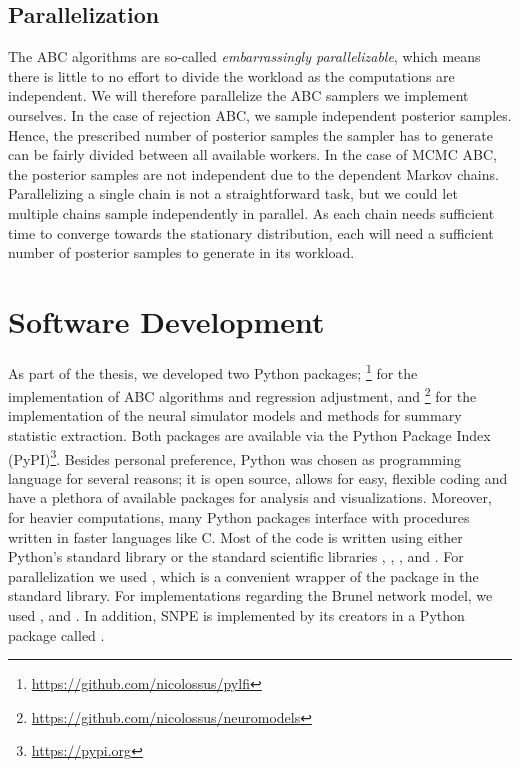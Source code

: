\subsection{Parallelization}

The ABC algorithms are so-called \textit{embarrassingly parallelizable}, which means there is little to no effort to divide the workload as the computations are independent. We will therefore parallelize the ABC samplers we implement ourselves. In the case of rejection ABC, we sample independent posterior samples. Hence, the prescribed number of posterior samples the sampler has to generate can be fairly divided between all available workers. In the case of MCMC ABC, the posterior samples are not independent due to the dependent Markov chains. Parallelizing a single chain is not a straightforward task, but we could let multiple chains sample independently in parallel. As each chain needs sufficient time to converge towards the stationary distribution, each will need a sufficient number of posterior samples to generate in its workload.

\section{Software Development}\label{sec:software}

As part of the thesis, we developed two Python packages; \footnote{\url{https://github.com/nicolossus/pylfi}} for the implementation of ABC algorithms and regression adjustment, and \footnote{\url{https://github.com/nicolossus/neuromodels}} for the implementation of the neural simulator models and methods for summary statistic extraction. Both packages are available via the Python Package Index (PyPI)\footnote{\url{https://pypi.org}}. Besides personal preference, Python was chosen as programming language for several reasons; it is open source, allows for easy, flexible coding and have a plethora of available packages for analysis and visualizations. Moreover, for heavier computations, many Python packages interface with procedures written in faster languages like C. Most of the code is written using either Python's standard library or the standard scientific libraries  \cite{numpy},  \cite{scipy},  \cite{matplotlib},  \cite{pandas} and  \cite{seaborn}. For parallelization we used  \cite{pathos}, which is a convenient wrapper of the  package in the standard library. For implementations regarding the Brunel network model, we used  \cite{nest},  \cite{neo} and  \cite{elephant}. In addition, SNPE is implemented by its creators in a Python package called  \cite{sbi}. 

